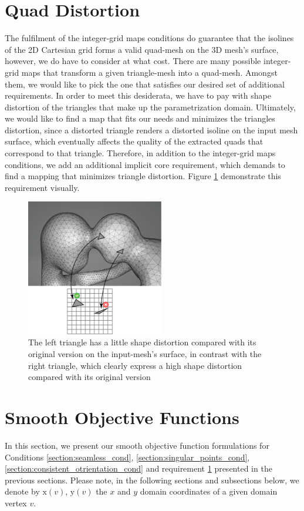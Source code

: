 \section{Quad Distortion}
\label{section:quad_distortion_cond}
The fulfilment of the integer-grid maps conditions do guarantee that the isolines of the 2D Cartesian grid forms a valid quad-mesh on the 3D mesh's surface, however, we do have to consider at what cost. There are many possible integer-grid maps that transform a given triangle-mesh into a quad-mesh. Amongst them, we would like to pick the one that satisfies our desired set of additional requirements. In order to meet this desiderata, we have to pay with shape distortion of the triangles that make up the parametrization domain. Ultimately, we would like to find a map that fits our needs and minimizes the triangles distortion, since a distorted triangle renders a distorted isoline on the input mesh surface, which eventually affects the quality of the extracted quads that correspond to that triangle. Therefore, in addition to the integer-grid maps conditions, we add an additional implicit core requirement, which demands to find a mapping that minimizes triangle distortion. Figure \ref{fig:distortion_req} demonstrate this requirement visually.
\begin{figure}[ht]
\centering
\includegraphics[width=6cm]{figures/distortion/distortion.png}
\caption[The Orientation Requirement]{The left triangle has a little shape distortion compared with its original version on the input-mesh's surface, in contrast with the right triangle, which clearly express a high shape distortion compared with its original version}
\label{fig:distortion_req}
\end{figure}
\section{Smooth Objective Functions}
\label{section:smooth_objective_functions}
In this section, we present our smooth objective function formulations for Conditions \ref{section:seamless_cond}, \ref{section:singular_points_cond}, \ref{section:consistent_otrientation_cond} and requirement \ref{section:quad_distortion_cond} presented in the previous sections. Please note, in the following sections and subsections below, we denote by $\mathrm{x}\left(v\right)$, $\mathrm{y}\left(v\right)$ the $x$ and $y$ domain coordinates of a given domain vertex $v$.
